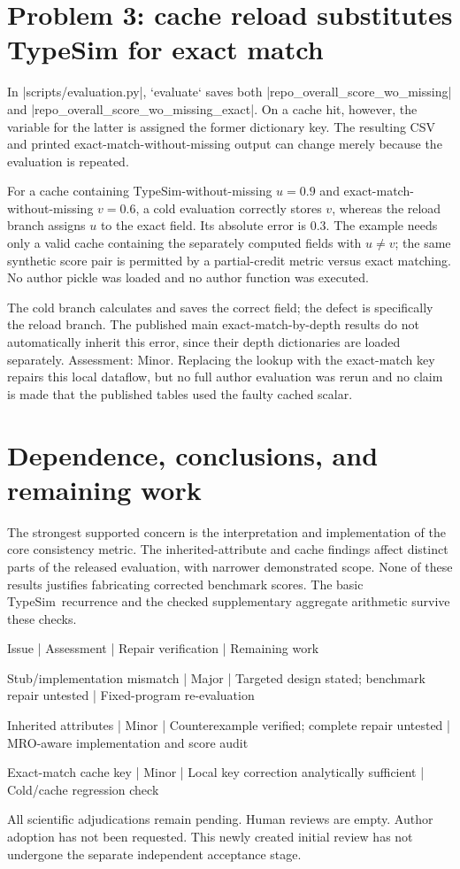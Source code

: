 \documentclass[10pt]{article}
\begin{document}
\section*{Problem 3: cache reload substitutes TypeSim for exact match}
In |scripts/evaluation.py|, `evaluate` saves both |repo\_overall\_score\_wo\_missing| and |repo\_overall\_score\_wo\_missing\_exact|. On a cache hit, however, the variable for the latter is assigned the former dictionary key. The resulting CSV and printed exact-match-without-missing output can change merely because the evaluation is repeated.\par
For a cache containing TypeSim-without-missing \(u=0.9\) and exact-match-without-missing \(v=0.6\), a cold evaluation correctly stores \(v\), whereas the reload branch assigns \(u\) to the exact field. Its absolute error is \(0.3\). The example needs only a valid cache containing the separately computed fields with \(u\ne v\); the same synthetic score pair is permitted by a partial-credit metric versus exact matching. No author pickle was loaded and no author function was executed.\par
The cold branch calculates and saves the correct field; the defect is specifically the reload branch. The published main exact-match-by-depth results do not automatically inherit this error, since their depth dictionaries are loaded separately. Assessment: Minor. Replacing the lookup with the exact-match key repairs this local dataflow, but no full author evaluation was rerun and no claim is made that the published tables used the faulty cached scalar.\par
\section*{Dependence, conclusions, and remaining work}
The strongest supported concern is the interpretation and implementation of the core consistency metric. The inherited-attribute and cache findings affect distinct parts of the released evaluation, with narrower demonstrated scope. None of these results justifies fabricating corrected benchmark scores. The basic TypeSim recurrence and the checked supplementary aggregate arithmetic survive these checks.\par
Issue | Assessment | Repair verification | Remaining work\par
Stub/implementation mismatch | Major | Targeted design stated; benchmark repair untested | Fixed-program re-evaluation\par
Inherited attributes | Minor | Counterexample verified; complete repair untested | MRO-aware implementation and score audit\par
Exact-match cache key | Minor | Local key correction analytically sufficient | Cold/cache regression check\par
All scientific adjudications remain pending. Human reviews are empty. Author adoption has not been requested. This newly created initial review has not undergone the separate independent acceptance stage.\par
\end{document}
